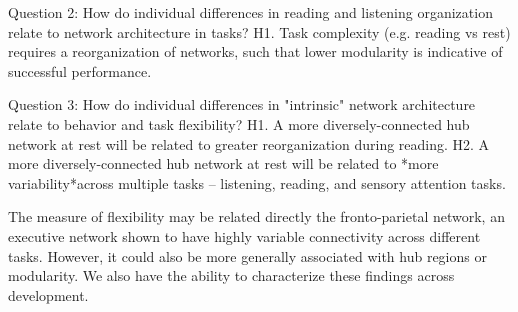 Question 2: How do individual differences in reading and listening organization relate to network architecture in tasks?
H1. Task complexity (e.g. reading vs rest) requires a reorganization of networks, such that lower modularity is indicative of successful performance.


Question 3: How do individual differences in "intrinsic" network architecture relate to behavior and task flexibility?
H1.	A more diversely-connected hub network at rest will be related to greater reorganization during reading.
H2.	A more diversely-connected hub network at rest will be related to *more variability*across multiple tasks – listening, reading, and sensory attention tasks.

The measure of flexibility may be related directly the fronto-parietal network, an executive network shown to have highly variable connectivity across different tasks. However, it could also be more generally associated with hub regions or modularity. We also have the ability to characterize these findings across development.